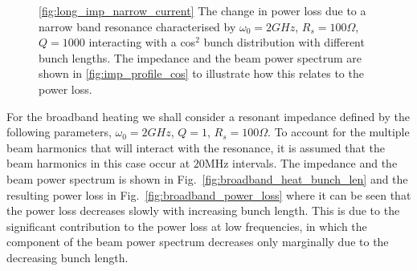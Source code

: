 \documentclass[12pt,a4paper,twopage,openright]{report}
\begin{document}
\begin{figure}
\caption{\ref{fig:long_imp_narrow_current} The change in power loss due to a narrow band resonance characterised by $\omega_{0} = 2GHz$, $R_{s} = 100\Omega$, $Q = 1000$ interacting with a cos$^{2}$ bunch distribution with different bunch lengths. The impedance and the beam power spectrum are shown in \ref{fig:imp_profile_cos} to illustrate how this relates to the power loss.}
\end{figure}

For the broadband heating we shall consider a resonant impedance defined by the following parameters, $\omega_{0} = 2GHz$, $Q=1$, $R_{s}=100\Omega$. To account for the multiple beam harmonics that will interact with the resonance, it is assumed that the beam harmonics in this case occur at $20$MHz intervals. The impedance and the beam power spectrum is shown in Fig.~\ref{fig:broadband_heat_bunch_len} and the resulting power loss in Fig.~\ref{fig:broadband_power_loss} where it can be seen that the power loss decreases slowly with increasing bunch length. This is due to the significant contribution to the power loss at low frequencies, in which the component of the beam power spectrum decreases only marginally due to the decreasing bunch length.
\end{document}
